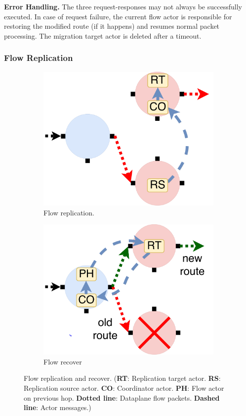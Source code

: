 \textbf{Error Handling.} The three request-responses may not always be successfully executed. In case of request failure, the current flow actor is responsible for restoring the modified route (if it happens) and resumes normal packet processing. The migration target actor is deleted after a timeout.

\subsubsection{Flow Replication}

\begin{figure}[!h]
\begin{subfigure}[t]{0.49\linewidth}
   \centering
   \includegraphics[width=0.66\columnwidth]{figure/nfactor-replication.pdf}
   \caption{Flow replication.}\label{fig:rep}
  \end{subfigure}
  \begin{subfigure}[t]{0.49\linewidth}
     \centering
     \includegraphics[width=0.66\columnwidth]{figure/nfactor-recover.pdf}
     \caption{Flow recover}\label{fig:recover}
    \end{subfigure}
 \caption{Flow replication and recover. (\textbf{RT}: Replication target actor. \textbf{RS}: Replication source actor. \textbf{CO}: Coordinator actor. \textbf{PH}: Flow actor on previous hop. \textbf{Dotted line}: Dataplane flow packets. \textbf{Dashed line}: Actor messages.)}
\label{fig:flow-rep}
\end{figure}

